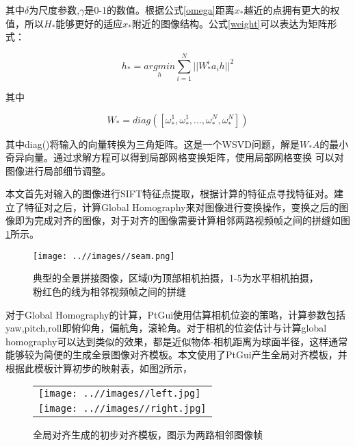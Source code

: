 其中$\delta$为尺度参数,$\gamma$是0-1的数值。根据公式\ref{omega}距离$x_*$越近的点拥有更大的权值，所以$H_*$能够更好的适应$x_*$附近的图像结构。公式\ref{weight}可以表达为矩阵形式：
\begin{center}
  \begin{equation}\label{weight_matrix}
    h_*=\underset{h}{argmin}\sum_{i=1}^{N}||W_*^ia_ih||^2
  \end{equation}
\end{center}
其中
\begin{center}
  \begin{equation}\label{weight_matrix}
    W_*=diag([\omega_*^1,\omega_*^1,...,\omega_*^N,\omega_*^N])
  \end{equation}
\end{center}
其中diag()将输入的向量转换为三角矩阵。这是一个WSVD问题，解是$W_*A$的最小奇异向量。通过求解方程可以得到局部网格变换矩阵，使用局部网格变换
可以对图像进行局部细节调整。


\indent 本文首先对输入的图像进行SIFT特征点提取，根据计算的特征点寻找特征对。建立了特征对之后，计算Global Homography来对图像进行变换操作，变换之后的图像即为完成对齐的图像，对于对齐的图像需要计算相邻两路视频帧之间的拼缝如图\ref{seam}所示。
\begin{figure}
  \centering
  \texttt{[image: ..//images//seam.png]}
  \caption{典型的全景拼接图像，区域0为顶部相机拍摄，1-5为水平相机拍摄，粉红色的线为相邻视频帧之间的拼缝}\label{seam}
\end{figure}
对于Global Homography的计算，PtGui使用估算相机位姿的策略，计算参数包括yaw,pitch,roll即俯仰角，偏航角，滚轮角。对于相机的位姿估计与计算global homography可以达到类似的效果，都是近似物体-相机距离为球面半径，这样通常能够较为简便的生成全景图像对齐模板。本文使用了PtGui产生全局对齐模板，并根据此模板计算初步的映射表，如图\ref{source}所示，
\begin{figure}[h]
\begin{tabular}{l}
  \texttt{[image: ..//images//left.jpg]} \\
  \texttt{[image: ..//images//right.jpg]}
\end{tabular}
  \caption{全局对齐生成的初步对齐模板，图示为两路相邻图像帧}\label{source}
\end{figure}

